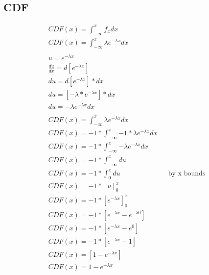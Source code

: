 \documentclass[]{book}
\begin{document}
\subsection{CDF}
\begin{align*}
	CDF(x) = \int_{-\infty}^{x} {f_xdx}\\
	CDF(x) = \int_{-\infty}^{x} {\lambda e^{-\lambda x}dx}\\
	\\
	u = e^{-\lambda x}\\
	\frac{du}{dx} = d[e^{-\lambda x}]\\
	du = d[e^{-\lambda x}]*dx\\
	du = [-\lambda * e^{-\lambda x}]*dx\\
	du = -\lambda e^{-\lambda x}dx\\
	\\
	CDF(x) = \int_{-\infty}^{x} {\lambda e^{-\lambda x}dx}\\
	CDF(x) = -1*\int_{-\infty}^{x} {-1*\lambda e^{-\lambda x}dx}\\
	CDF(x) = -1*\int_{-\infty}^{x} {-\lambda e^{-\lambda x}dx}\\
	CDF(x) = -1*\int_{-\infty}^{x} {du}\\
	CDF(x) = -1*\int_{0}^{x} {du} && \text{by x bounds}\\
	CDF(x) = -1*[u]_{0}^{x}\\
	CDF(x) = -1*[e^{-\lambda x}]_{0}^{x}\\
	CDF(x) = -1*[e^{-\lambda x} - e^{-\lambda 0}]\\
	CDF(x) = -1*[e^{-\lambda x} - e^{0}]\\
	CDF(x) = -1*[e^{-\lambda x} - 1]\\
	CDF(x) = [1 - e^{-\lambda x}]\\
	CDF(x) = 1 - e^{-\lambda x}\\
\end{align*}
\end{document}
